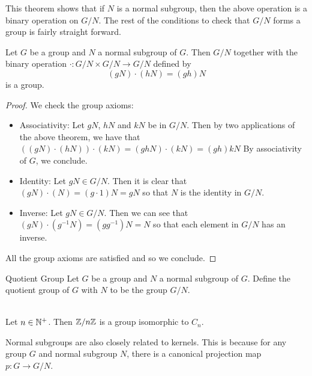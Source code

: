 \documentclass[a4paper]{article}
\begin{document}
This theorem shows that if $N$ is a normal subgroup, then the above operation is a binary operation on $G/N$. The rest of the conditions to check that $G/N$ forms a group is fairly straight forward. 

\begin{prp}{}{} Let $G$ be a group and $N$ a normal subgroup of $G$. Then $G/N$ together with the binary operation $\cdot:G/N\times G/N\to G/N$ defined by $$(gN)\cdot(hN)=(gh)N$$ is a group. 
\begin{proof}
We check the group axioms: 
\begin{itemize}
\item Associativity: Let $gN$, $hN$ and $kN$ be in $G/N$. Then by two applications of the above theorem, we have that $((gN)\cdot(hN))\cdot(kN)=(ghN)\cdot(kN)=(gh)kN$ By associativity of $G$, we conclude. 
\item Identity: Let $gN\in G/N$. Then it is clear that $(gN)\cdot(N)=(g\cdot 1)N=gN$ so that $N$ is the identity in $G/N$. 
\item Inverse: Let $gN\in G/N$. Then we can see that $(gN)\cdot(g^{-1}N)=(gg^{-1})N=N$ so that each element in $G/N$ has an inverse. 
\end{itemize}
All the group axioms are satisfied and so we conclude. 
\end{proof}
\end{prp}

\begin{defn}{Quotient Group}{} Let $G$ be a group and $N$ a normal subgroup of $G$. Define the quotient group of $G$ with $N$ to be the group $G/N$. 
\end{defn}

\begin{eg}{}{}\\
Let $n\in\mathbb{N}^+$. Then $\mathbb{Z}/n\mathbb{Z}$ is a group isomorphic to $C_n$. 
\end{eg}

Normal subgroups are also closely related to kernels. This is because for any group $G$ and normal subgroup $N$, there is a canonical projection map $p:G\to G/N$. 
\end{document}
